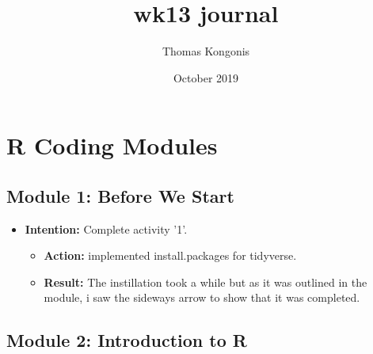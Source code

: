 \documentclass{article}
\title{wk13 journal}
\author{Thomas Kongonis}
\date{October 2019}
\begin{document}
\maketitle

\tableofcontents

\section{R Coding Modules}

\subsection{Module 1: Before We Start}
\begin{itemize}
\item{\textbf{Intention:} Complete activity '1'.}

\begin{itemize}
\item{\textbf{Action:} implemented install.packages for tidyverse.}
\item{\textbf{Result:} The instillation took a while but as it was outlined in the module, i saw the sideways arrow to show that it was completed.}
\end{itemize}
\end{itemize}


\subsection{Module 2: Introduction to R}
\end{document}
